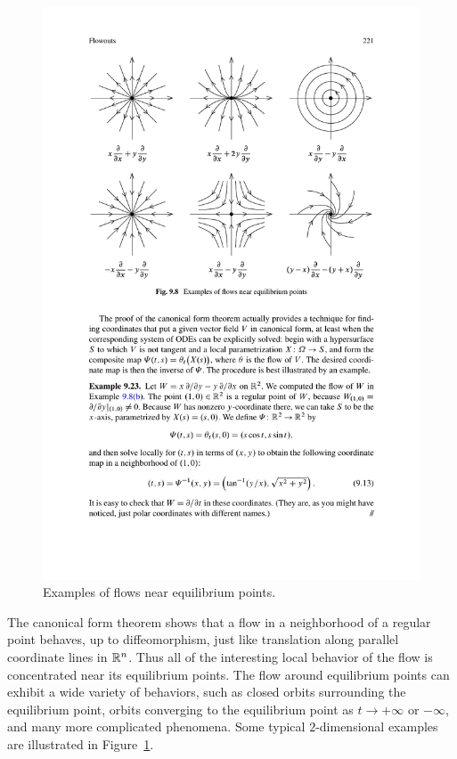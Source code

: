 \begin{figure}[htbp]
\centering
\includegraphics{pictures/equilibrium}
\caption{Examples of flows near equilibrium points.}
\label{equilibrium}
\end{figure}
The canonical form theorem shows that a flow in a neighborhood of a regular point behaves, up to diffeomorphism, just like translation along parallel coordinate
lines in $\mathbb{R}^n$. Thus all of the interesting local behavior of the flow is concentrated near its equilibrium points. The flow around equilibrium points can exhibit a wide variety of behaviors, such as closed orbits surrounding the equilibrium point, orbits converging to the equilibrium point as $t\to+\infty$ or $-\infty$, and many more complicated phenomena. Some typical $2$-dimensional examples are illustrated in Figure~\ref{equilibrium}.

